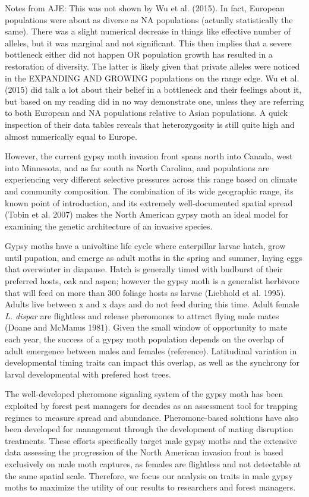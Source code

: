 \documentclass[smallextended]{svjour3}
\begin{document}
Notes from AJE: This was not shown by Wu et al. (2015). In fact, European
populations were about as diverse as NA populations (actually statistically  the
same). There was a slight numerical decrease in things like effective number of
alleles, but it was marginal and not significant.  This then implies that a
severe bottleneck either did not happen OR population growth has resulted in a
restoration of diversity. The latter is likely given that private alleles were
noticed in the EXPANDING AND GROWING populations on the range edge.  Wu et al.
(2015) did talk a lot about their belief in a bottleneck and their feelings
about it, but based on my reading did in no way demonstrate one, unless they are
referring to both European and NA populations relative to Asian populations. A
quick inspection of their data tables reveals that heterozygosity is still quite
high and almost numerically equal to Europe.

However, the current gypsy moth invasion front spans north into Canada, west
into Minnesota, and as far south as North Carolina, and populations are
experiencing very different selective pressures across this range based on
climate and community composition. The combination of its wide geographic range,
its known point of introduction, and its extremely well-documented spatial
spread (Tobin et al. 2007) makes the North American gypsy moth an ideal model
for examining the genetic architecture of an invasive species.

Gypsy moths have a univoltine life cycle where caterpillar larvae hatch, grow
until pupation, and emerge as adult moths in the spring and summer, laying eggs
that overwinter in diapause. Hatch is generally timed with budburst of their
preferred hosts, oak and aspen; however the gypsy moth is a generalist herbivore
that will feed on more than 300 foliage hosts as larvae (Liebhold et al. 1995).
Adults live between x and x days and do not feed during this time. Adult female
\textit{L. dispar} are flightless and release pheromones to attract flying male
mates (Doane and McManus 1981). Given the small window of opportunity to mate
each year, the success of a gypsy moth population depends on the overlap of adult
emergence between males and females (reference). Latitudinal variation in
developmental timing traits can impact this overlap, as well as the synchrony
for larval developmental with prefered host trees.

The well-developed pheromone signaling system of the gypsy moth has been
exploited by forest pest managers for decades as an assessment tool for trapping
regimes to measure spread and abundance. Pheromone-based solutions have also
been developed for management through the development of mating disruption
treatments. These efforts specifically target male gypsy moths and the extensive
data assessing the progression of the North American invasion front is based
exclusively on male moth captures, as females are flightless and not detectable
at the same spatial scale. Therefore, we focus our analysis on traits in male
gypsy moths to maximize the utility of our results to researchers and forest
managers.
\end{document}
